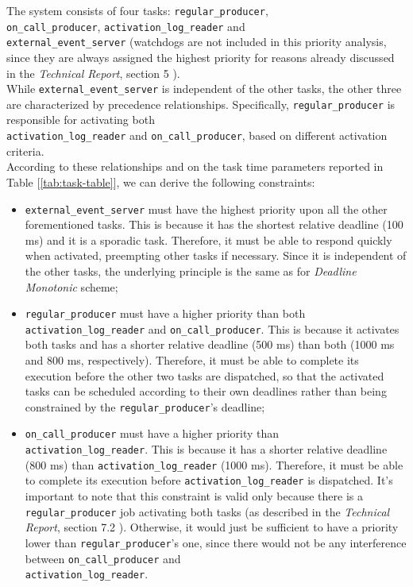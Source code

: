 \documentclass[sigconf, screen]{acmart}
\begin{document}
The system consists of four tasks: \texttt{regular\_producer}, \\
\texttt{on\_call\_producer}, \texttt{activation\_log\_reader} and \\
\texttt{external\_event\_server} (watchdogs are not included in this priority
analysis, since they are always assigned the highest priority for reasons
already discussed in the \textit{Technical Report}, section 5
\cite{TechnicalReport}). \\ 
While \texttt{external\_event\_server} is independent of the other tasks, the
other three are characterized by precedence relationships. Specifically,
\texttt{regular\_producer} is responsible for activating both \\
\texttt{activation\_log\_reader} and \texttt{on\_call\_producer}, based on
different activation criteria. \\
According to these relationships and on the task time parameters reported in Table
[\ref{tab:task-table}], we can derive the following constraints:
\begin{itemize}
  \item \texttt{external\_event\_server} must have the highest priority upon all
  the other forementioned tasks. This is because it has the shortest relative
  deadline (100 ms) and it is a sporadic task. Therefore, it must be able to
  respond quickly when activated, preempting other tasks if necessary. Since it
  is independent of the other tasks, the underlying principle is the same as
  for \textit{Deadline Monotonic} scheme; 
  \item \texttt{regular\_producer} must have a higher priority than both
  \texttt{activation\_log\_reader} and \texttt{on\_call\_producer}. This is
  because it activates both tasks and has a shorter relative deadline (500 ms)
  than both (1000 ms and 800 ms, respectively). Therefore, it must be able to
  complete its execution before the other two tasks are dispatched, so that the
  activated tasks can be scheduled according to their own deadlines rather than
  being constrained by the \texttt{regular\_producer}'s deadline;
  \item \texttt{on\_call\_producer} must have a higher priority than \\
  \texttt{activation\_log\_reader}. This is because it has a shorter relative
  deadline (800 ms) than \texttt{activation\_log\_reader} (1000 ms). Therefore,
  it must be able to complete its execution before
  \texttt{activation\_log\_reader} is dispatched. It's important to note that
  this constraint is valid only because there is a \texttt{regular\_producer}
  job activating both tasks (as described in the \textit{Technical Report},
  section 7.2 \cite{TechnicalReport}). Otherwise, it would just be sufficient to
  have a priority lower than \texttt{regular\_producer}'s one, since there would
  not be any interference between \texttt{on\_call\_producer} and \\
  \texttt{activation\_log\_reader}.
\end{itemize}
\end{document}
